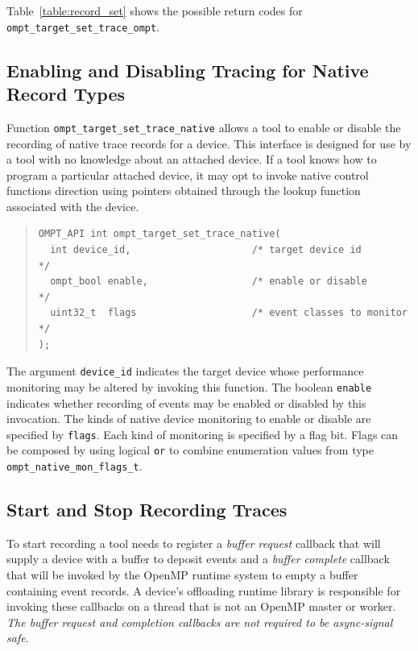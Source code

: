 \documentclass{article}
\begin{document}
Table~\ref{table:record_set} shows the possible return codes for \verb|ompt_target_set_trace_ompt|.


\subsection{Enabling and Disabling Tracing for Native Record Types}
\label{sec:trace-event-native}
Function \verb|ompt_target_set_trace_native| allows a tool to enable or disable the recording of native trace records for a device. This interface is designed for use by a tool with no 
knowledge about an attached device. If a tool knows how to program a particular attached device, it may opt to invoke native control functions direction using pointers obtained through the lookup function associated with the device.

\begin{quote}
\begin{verbatim}
OMPT_API int ompt_target_set_trace_native(
  int device_id,                     /* target device id                */
  ompt_bool enable,                  /* enable or disable               */
  uint32_t  flags                    /* event classes to monitor        */
);
\end{verbatim}
\end{quote}
The argument \verb|device_id| indicates the target device whose performance monitoring may be altered by invoking this function. The boolean \verb|enable| indicates whether recording of events may be enabled or disabled by this invocation.
The kinds of native device monitoring to enable or disable are specified by \verb|flags|. Each kind of monitoring is specified by a flag bit. Flags can be composed by using logical {\tt or}  to combine enumeration values from type \verb|ompt_native_mon_flags_t|.


\subsection{Start and Stop Recording Traces}
\label{sec:start-stop-recording}

To start recording a tool needs to register a \emph{buffer request} callback that will supply a device with a buffer to deposit events and a \emph{buffer complete} callback that will be invoked by the OpenMP runtime system to empty a buffer containing event records. A device's offloading runtime library is responsible for invoking these callbacks on a thread that is not an OpenMP master or worker. {\em The buffer request and completion callbacks are not required to  be async-signal safe.}
\end{document}
